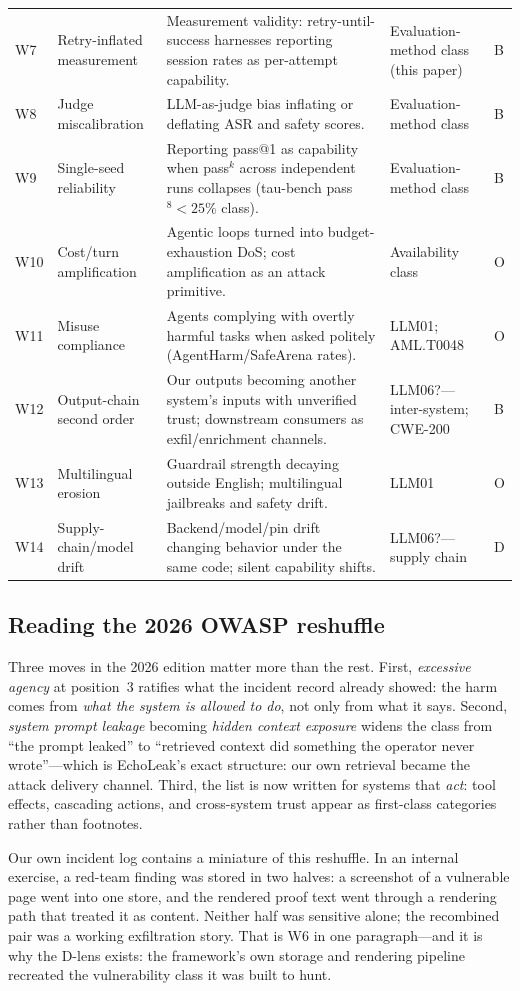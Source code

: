 \begin{longtable}{L{0.8cm} L{3.0cm} L{4.2cm} L{3.1cm} L{0.8cm}}
W7 & Retry-inflated measurement & Measurement validity: retry-until-success
harnesses reporting session rates as per-attempt capability. & Evaluation-method
class (this paper) & B \\
W8 & Judge miscalibration & LLM-as-judge bias inflating or deflating ASR and
safety scores. & Evaluation-method class \cite{judgesurvey} & B \\
W9 & Single-seed reliability & Reporting pass@1 as capability when pass$^k$ across
independent runs collapses (tau-bench pass$^8<25\%$ class). &
Evaluation-method class \cite{taubench} & B \\
W10 & Cost/turn amplification & Agentic loops turned into budget-exhaustion DoS;
cost amplification as an attack primitive. & Availability class & O \\
W11 & Misuse compliance & Agents complying with overtly harmful tasks when asked
politely (AgentHarm/SafeArena rates). & LLM01; AML.T0048 & O \\
W12 & Output-chain second order & Our outputs becoming another system's inputs
with unverified trust; downstream consumers as exfil/enrichment channels. &
LLM06?---inter-system; CWE-200 & B \\
W13 & Multilingual erosion & Guardrail strength decaying outside English;
multilingual jailbreaks and safety drift. & LLM01 & O \\
W14 & Supply-chain/model drift & Backend/model/pin drift changing behavior under
the same code; silent capability shifts. & LLM06?---supply chain & D \\
\end{longtable}

\subsection{Reading the 2026 OWASP reshuffle}\label{sec:owasp2026}

Three moves in the 2026 edition matter more than the rest. First, \emph{excessive
agency} at position~3 ratifies what the incident record already showed: the harm
comes from \emph{what the system is allowed to do}, not only from what it says.
Second, \emph{system prompt leakage} becoming \emph{hidden context exposure}
widens the class from ``the prompt leaked'' to ``retrieved context did something
the operator never wrote''---which is EchoLeak's exact structure: our own
retrieval became the attack delivery channel. Third, the list is now written for
systems that \emph{act}: tool effects, cascading actions, and cross-system trust
appear as first-class categories rather than footnotes.

Our own incident log contains a miniature of this reshuffle. In an internal
exercise, a red-team finding was stored in two halves: a screenshot of a vulnerable
page went into one store, and the rendered proof text went through a rendering
path that treated it as content. Neither half was sensitive alone; the recombined
pair was a working exfiltration story. That is W6 in one paragraph---and it is
why the D-lens exists: the framework's own storage and rendering pipeline recreated
the vulnerability class it was built to hunt.
